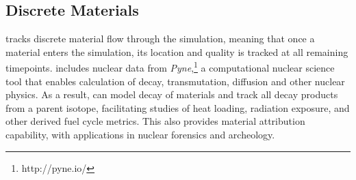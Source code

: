 \subsection{Discrete Materials}
\Cyclus tracks discrete material flow through the simulation, meaning that once a material enters the simulation, its location and quality is tracked at all remaining timepoints\cite{huff_integrated:_2013}.  \Cyclus includes nuclear data from \emph{Pyne},\footnote{http://pyne.io/} a computational nuclear science tool that enables calculation of decay, transmutation, diffusion and other nuclear physics\cite{Scopatz2012b}. As a result, \Cyclus can  model decay of materials and track all decay products from a parent isotope, facilitating studies of heat loading, radiation exposure, and other derived fuel cycle metrics\cite{scopatz_cymetric_2015}. This also provides material attribution capability, with applications in nuclear forensics and archeology.
